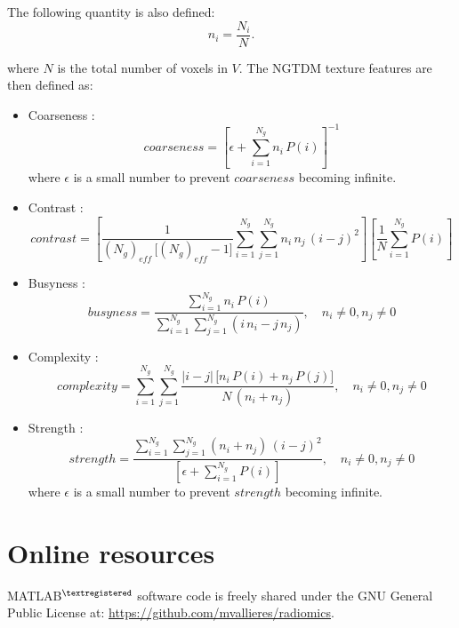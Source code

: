 \documentclass{article}
\begin{document}
\noindent The following quantity is also defined:
\[n_i = \frac{N_i}{N}.\]

\noindent where $N$ is the total number of voxels in $V$. The NGTDM texture features are then defined as:

\begin{itemize}
	\item Coarseness \cite{AmadasunM1989}:
		  \[coarseness = \left[\epsilon + \sum_{i=1}^{N_g} n_i\,P(i)\right]^{-1}\]
		  where $\epsilon$ is a small number to prevent $coarseness$ becoming infinite.
	\item Contrast \cite{AmadasunM1989}:
		  \[contrast = \left[\frac{1}{(N_g)_{eff}\,\big[(N_g)_{eff}-1\big]}\sum_{i=1}^{N_g}\sum_{j=1}^{N_g} 
		  n_i\,n_j\,(i-j)^2\right]\left[\frac{1}{N}\sum_{i=1}^{N_g} P(i)\right]\]
	\item Busyness \cite{AmadasunM1989}:
		  \[busyness = \frac{\sum_{i=1}^{N_g} n_i\,P(i)}{\sum_{i=1}^{N_g}\sum_{j=1}^{N_g} (i\,n_i - j\,n_j)}, 
		  \quad n_i \neq 0,n_j \neq 0\]
	\item Complexity \cite{AmadasunM1989}:
		  \[complexity = \sum_{i=1}^{N_g}\sum_{j=1}^{N_g} \frac{|i-j|\,\big[n_i\,P(i) + n_j\,P(j)\big]}{N\,(n_i 
		  + n_j)}, \quad n_i \neq 0,n_j \neq 0\]
	\item Strength \cite{AmadasunM1989}:
		  \[strength = \frac{\sum_{i=1}^{N_g}\sum_{j=1}^{N_g} (n_i + n_j)\,(i-j)^2}{\left[\epsilon + 
		  \sum_{i=1}^{N_g} P(i)\right]},  \quad n_i \neq 0,n_j \neq 0\]
		  where $\epsilon$ is a small number to prevent $strength$ becoming infinite.
	\\
\end{itemize}


\section*{Online resources} 
MATLAB$^{\textregistered}$ software code is freely shared under the GNU General Public License at: \url{https://github.com/mvallieres/radiomics}.
\end{document}
